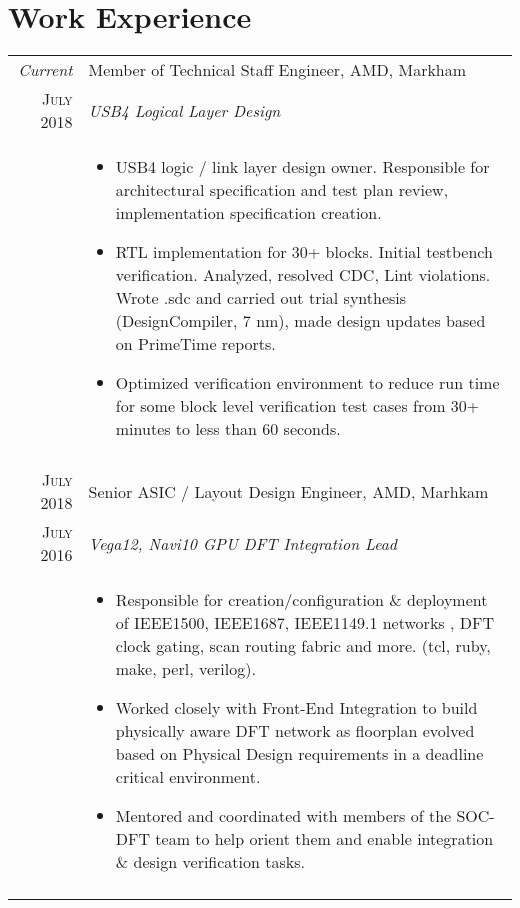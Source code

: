 \documentclass[a4paper,10pt]{article}
\begin{document}
\section{Work Experience}
\begin{longtable}{r|p{15cm}}
 \emph{Current} & Member of Technical Staff Engineer, \textsc{AMD}, Markham
\\\textsc{July 2018}&\emph{USB4 Logical Layer Design}\\&\footnotesize{

\begin{itemize}\vspace*{-\baselineskip}
  \item USB4 logic / link layer design owner. Responsible for architectural specification and test plan review, implementation specification creation.
  \item RTL implementation for 30+ blocks. Initial testbench verification. Analyzed, resolved CDC, Lint violations. Wrote .sdc and carried out trial synthesis (DesignCompiler, 7 nm), made design updates based on PrimeTime reports.
  \item Optimized verification environment to reduce run time for some block level verification test cases from 30+ minutes to less than 60 seconds.
\end{itemize}\vspace*{-\baselineskip}\vspace*{-\baselineskip}

}\\\multicolumn{2}{c}{} \\

 \textsc{July 2018} & Senior ASIC / Layout Design Engineer, \textsc{AMD}, Marhkam
\\\textsc{July 2016}&\emph{Vega12, Navi10 GPU DFT Integration Lead}\\&\footnotesize{
\begin{itemize}\vspace*{-\baselineskip}
  \item Responsible for creation/configuration \& deployment of IEEE1500, IEEE1687, IEEE1149.1 networks , DFT clock gating, scan routing fabric and more. (tcl, ruby, make, perl, verilog).
  \item Worked closely with Front-End Integration to build physically aware DFT network as floorplan evolved based on Physical Design requirements in a deadline critical environment.
  \item Mentored and coordinated with members of the SOC-DFT team to help orient them and enable integration \& design verification tasks.
\end{itemize}\vspace*{-\baselineskip}\vspace*{-\baselineskip}
}\\\multicolumn{2}{c}{} \\


\end{longtable}
\end{document}
